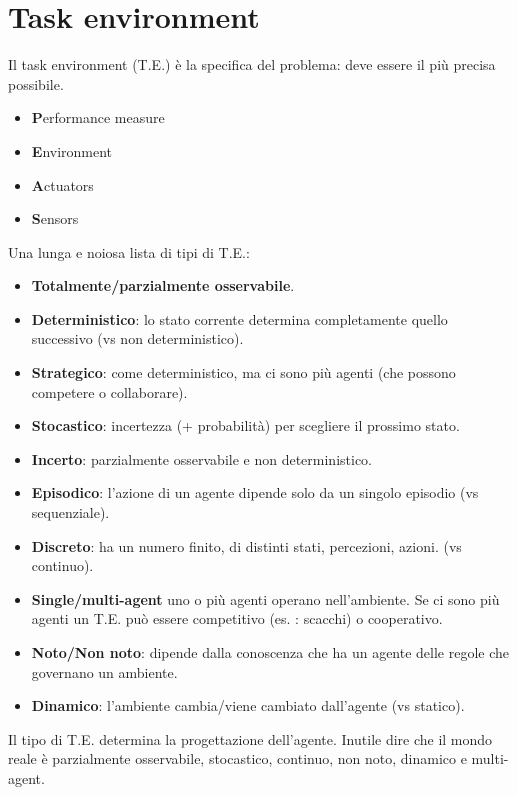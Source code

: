 \newpage

\section{Task environment}

Il task environment (T.E.) è la specifica del problema: deve essere il più precisa
possibile.

\begin{itemize}
 \item \textbf{P}erformance measure
 \item \textbf{E}nvironment
 \item \textbf{A}ctuators
 \item \textbf{S}ensors
\end{itemize}

Una lunga e noiosa lista di tipi di T.E.:

\begin{itemize}
 \item \textbf{Totalmente/parzialmente osservabile}.
 \item \textbf{Deterministico}: lo stato corrente determina completamente quello successivo (vs non deterministico).
 \item \textbf{Strategico}: come deterministico, ma ci sono più agenti (che possono competere o collaborare).
 \item \textbf{Stocastico}: incertezza (+ probabilità) per scegliere il prossimo stato.
 \item \textbf{Incerto}: parzialmente osservabile e non deterministico.
 \item \textbf{Episodico}: l'azione di un agente dipende solo da un singolo episodio (vs sequenziale).
 \item \textbf{Discreto}: ha un numero finito, di distinti stati, percezioni, azioni. (vs continuo).
 \item \textbf{Single/multi-agent} uno o più agenti operano nell'ambiente. Se ci sono più agenti un T.E. può essere competitivo (es. : scacchi) o cooperativo.
 \item \textbf{Noto/Non noto}: dipende dalla conoscenza che ha un agente delle regole che governano un ambiente.
 \item \textbf{Dinamico}: l'ambiente cambia/viene cambiato dall'agente (vs statico).
\end{itemize}

Il tipo di T.E. determina la progettazione dell'agente.
Inutile dire che il mondo reale è parzialmente osservabile, stocastico, continuo, non noto,
dinamico e multi-agent.


